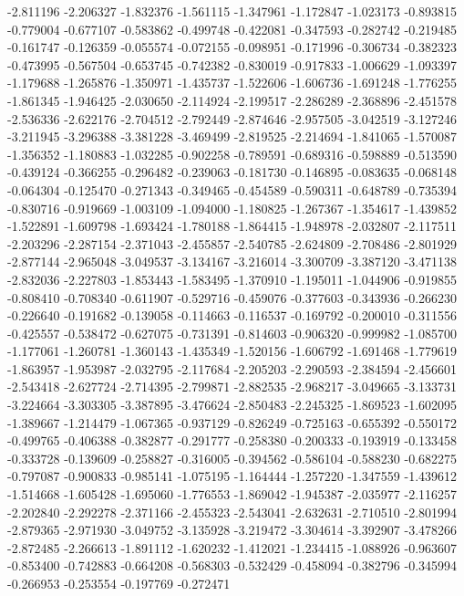 -2.811196
-2.206327
-1.832376
-1.561115
-1.347961
-1.172847
-1.023173
-0.893815
-0.779004
-0.677107
-0.583862
-0.499748
-0.422081
-0.347593
-0.282742
-0.219485
-0.161747
-0.126359
-0.055574
-0.072155
-0.098951
-0.171996
-0.306734
-0.382323
-0.473995
-0.567504
-0.653745
-0.742382
-0.830019
-0.917833
-1.006629
-1.093397
-1.179688
-1.265876
-1.350971
-1.435737
-1.522606
-1.606736
-1.691248
-1.776255
-1.861345
-1.946425
-2.030650
-2.114924
-2.199517
-2.286289
-2.368896
-2.451578
-2.536336
-2.622176
-2.704512
-2.792449
-2.874646
-2.957505
-3.042519
-3.127246
-3.211945
-3.296388
-3.381228
-3.469499
-2.819525
-2.214694
-1.841065
-1.570087
-1.356352
-1.180883
-1.032285
-0.902258
-0.789591
-0.689316
-0.598889
-0.513590
-0.439124
-0.366255
-0.296482
-0.239063
-0.181730
-0.146895
-0.083635
-0.068148
-0.064304
-0.125470
-0.271343
-0.349465
-0.454589
-0.590311
-0.648789
-0.735394
-0.830716
-0.919669
-1.003109
-1.094000
-1.180825
-1.267367
-1.354617
-1.439852
-1.522891
-1.609798
-1.693424
-1.780188
-1.864415
-1.948978
-2.032807
-2.117511
-2.203296
-2.287154
-2.371043
-2.455857
-2.540785
-2.624809
-2.708486
-2.801929
-2.877144
-2.965048
-3.049537
-3.134167
-3.216014
-3.300709
-3.387120
-3.471138
-2.832036
-2.227803
-1.853443
-1.583495
-1.370910
-1.195011
-1.044906
-0.919855
-0.808410
-0.708340
-0.611907
-0.529716
-0.459076
-0.377603
-0.343936
-0.266230
-0.226640
-0.191682
-0.139058
-0.114663
-0.116537
-0.169792
-0.200010
-0.311556
-0.425557
-0.538472
-0.627075
-0.731391
-0.814603
-0.906320
-0.999982
-1.085700
-1.177061
-1.260781
-1.360143
-1.435349
-1.520156
-1.606792
-1.691468
-1.779619
-1.863957
-1.953987
-2.032795
-2.117684
-2.205203
-2.290593
-2.384594
-2.456601
-2.543418
-2.627724
-2.714395
-2.799871
-2.882535
-2.968217
-3.049665
-3.133731
-3.224664
-3.303305
-3.387895
-3.476624
-2.850483
-2.245325
-1.869523
-1.602095
-1.389667
-1.214479
-1.067365
-0.937129
-0.826249
-0.725163
-0.655392
-0.550172
-0.499765
-0.406388
-0.382877
-0.291777
-0.258380
-0.200333
-0.193919
-0.133458
-0.333728
-0.139609
-0.258827
-0.316005
-0.394562
-0.586104
-0.588230
-0.682275
-0.797087
-0.900833
-0.985141
-1.075195
-1.164444
-1.257220
-1.347559
-1.439612
-1.514668
-1.605428
-1.695060
-1.776553
-1.869042
-1.945387
-2.035977
-2.116257
-2.202840
-2.292278
-2.371166
-2.455323
-2.543041
-2.632631
-2.710510
-2.801994
-2.879365
-2.971930
-3.049752
-3.135928
-3.219472
-3.304614
-3.392907
-3.478266
-2.872485
-2.266613
-1.891112
-1.620232
-1.412021
-1.234415
-1.088926
-0.963607
-0.853400
-0.742883
-0.664208
-0.568303
-0.532429
-0.458094
-0.382796
-0.345994
-0.266953
-0.253554
-0.197769
-0.272471
